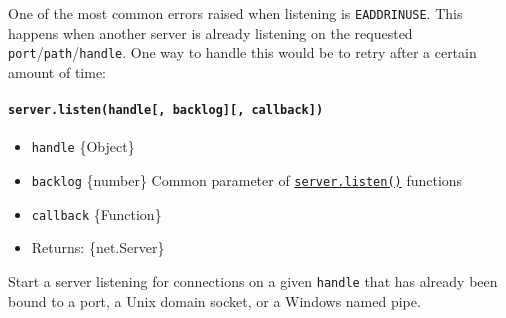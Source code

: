 One of the most common errors raised when listening is
\texttt{EADDRINUSE}. This happens when another server is already
listening on the requested \texttt{port}/\texttt{path}/\texttt{handle}.
One way to handle this would be to retry after a certain amount of time:

\begin{Shaded}
\begin{Highlighting}[]
\NormalTok{(}\OperatorTok{,}\KeywordTok{=\textgreater{}}\NormalTok{ \{}
   \OperatorTok{===} \NormalTok{) \{}
    \NormalTok{(}\NormalTok{)}\OperatorTok{;}
    \NormalTok{(() }\KeywordTok{=\textgreater{}}\NormalTok{ \{}
\NormalTok{()}\OperatorTok{;}
\OperatorTok{,}\OperatorTok{;}
\NormalTok{    \}}\OperatorTok{,} \NormalTok{)}\OperatorTok{;}
\NormalTok{  \}}
\NormalTok{\})}\OperatorTok{;}
\end{Highlighting}
\end{Shaded}

\paragraph{\texorpdfstring{\texttt{server.listen(handle{[},\ backlog{]}{[},\ callback{]})}}{server.listen(handle{[}, backlog{]}{[}, callback{]})}}\label{server.listenhandle-backlog-callback}

\begin{itemize}
\tightlist
\item
  \texttt{handle} \{Object\}
\item
  \texttt{backlog} \{number\} Common parameter of
  \hyperref[serverlisten]{\texttt{server.listen()}} functions
\item
  \texttt{callback} \{Function\}
\item
  Returns: \{net.Server\}
\end{itemize}

Start a server listening for connections on a given \texttt{handle} that
has already been bound to a port, a Unix domain socket, or a Windows
named pipe.

